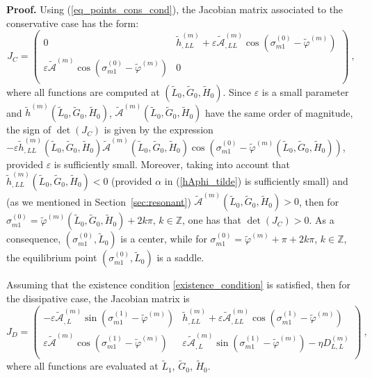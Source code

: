\documentclass[12pt,reqno]{amsart}
\numberwithin{equation}{section}
\newcommand\beq[1]{ \begin{equation}\label{#1} }
\newcommand{\eeq}{ \end{equation} }
\newcommand\equ[1]{{\rm (\ref{#1})}}
\begin{document}
{\bf Proof.}
Using \equ{eq_points_cons_cond}, the Jacobian matrix associated to the conservative case has the form:
$$
{J}_{C}=\left(%
\begin{array}{cc}
  0 & \widetilde{h}^{(m)}_{,LL}
  +\varepsilon  \widetilde{\mathcal{A}}_{,LL}^{(m)}
  \cos(\sigma_{m1}^{(0)}- \widetilde{\varphi}^{(m)})  \\
  \varepsilon  \widetilde{\mathcal{A}}^{(m)} \cos(\sigma_{m1}^{(0)}-
  \widetilde{\varphi}^{(m)}) & 0 \\
 \end{array}%
\right)\ ,
$$
where all functions are computed at $(\widetilde{L}_0, \widetilde{G}_0, \widetilde{H}_0)$.
Since $\varepsilon$ is a small parameter and $\widetilde{h}^{(m)}(\widetilde{L}_0, \widetilde{G}_0, \widetilde{H}_0)$,
$\widetilde{\mathcal{A}}^{(m)}(\widetilde{L}_0, \widetilde{G}_0, \widetilde{H}_0)$ have the same order of magnitude,
the sign of $ \det (J_C)$ is given by the expression
$ - \varepsilon \widetilde{h}^{(m)}_{,LL}(\widetilde{L}_0, \widetilde{G}_0, \widetilde{H}_0)
\widetilde{\mathcal{A}}^{(m)}(\widetilde{L}_0, \widetilde{G}_0, \widetilde{H}_0)
 \cos(\sigma_{m1}^{(0)}- \widetilde{\varphi}^{(m)}(\widetilde{L}_0, \widetilde{G}_0, \widetilde{H}_0))$,
provided $\varepsilon$ is sufficiently small.
Moreover, taking into account that $\widetilde{h}^{(m)}_{,LL}(\widetilde{L}_0, \widetilde{G}_0, \widetilde{H}_0)<0$
(provided $\alpha$ in \equ{hAphi_tilde} is sufficiently small) and (as we mentioned in Section~\ref{sec:resonant})
$\widetilde{\mathcal{A}}^{(m)}(\widetilde{L}_0, \widetilde{G}_0, \widetilde{H}_0)>0$, then  for
$\sigma_{m1}^{(0)}=\widetilde{\varphi}^{(m)}(\widetilde{L}_0, \widetilde{G}_0, \widetilde{H}_0)+2 k \pi $,
$k \in \mathbb{Z}$, one has that $\det (J_C) >0$. As a consequence, $(\sigma_{m1}^{(0)}, \widetilde{L}_0)$
is a center, while for $\sigma_{m1}^{(0)}=\widetilde{\varphi}^{(m)}+\pi +2 k \pi $,
$k \in \mathbb{Z}$, the equilibrium point $(\sigma_{m1}^{(0)}, \widetilde{L}_0)$ is a saddle.

Assuming that the existence condition \eqref{existence_condition} is satisfied, then
for the dissipative case, the Jacobian matrix is
\beq{Jdissipative}
{J}_{D}=\left(%
\begin{array}{cc}
 - \varepsilon  \widetilde{\mathcal{A}}_{,L}^{(m)}  \sin(\sigma_{m1}^{(1)}- \widetilde{\varphi}^{(m)}) &
 \widetilde{h}^{(m)}_{,LL} +\varepsilon  \widetilde{\mathcal{A}}_{,LL}^{(m)} \cos(\sigma_{m1}^{(1)}- \widetilde{\varphi}^{(m)})  \\
  \varepsilon  \widetilde{\mathcal{A}}^{(m)} \cos(\sigma_{m1}^{(1)}- \widetilde{\varphi}^{(m)}) &
  \varepsilon  \widetilde{\mathcal{A}}_{,L}^{(m)} \sin(\sigma_{m1}^{(1)}- \widetilde{\varphi}^{(m)})-\eta D_{L,L}^{(m)} \\
 \end{array}%
\right)\ ,
\eeq
where all functions are evaluated at $\widetilde{L}_1$, $\widetilde{G}_0$, $\widetilde{H}_0$.
\end{document}
